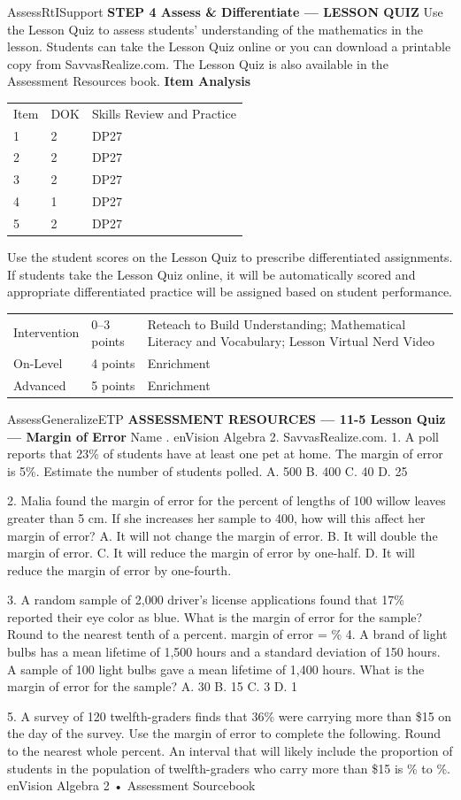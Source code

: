 \documentclass{article}
\newenvironment{te-addendum}[2]{}{}     %
\newcommand{\answer}[1]{}               %
\begin{document}
\begin{te-addendum}{Assess}{RtISupport}
\textbf{STEP 4 Assess & Differentiate — LESSON QUIZ}
Use the Lesson Quiz to assess students' understanding of the mathematics in the lesson.
Students can take the Lesson Quiz online or you can download a printable copy from SavvasRealize.com. The Lesson Quiz is also available in the Assessment Resources book.
\textbf{Item Analysis}
\begin{tabular}{lll}
Item & DOK & Skills Review and Practice \\
1 & 2 & DP27 \\
2 & 2 & DP27 \\
3 & 2 & DP27 \\
4 & 1 & DP27 \\
5 & 2 & DP27 \\
\end{tabular}
Use the student scores on the Lesson Quiz to prescribe differentiated assignments.
If students take the Lesson Quiz online, it will be automatically scored and appropriate differentiated practice will be assigned based on student performance.
\begin{tabular}{lll}
Intervention & 0–3 points & Reteach to Build Understanding; Mathematical Literacy and Vocabulary; Lesson Virtual Nerd Video \\
On-Level & 4 points & Enrichment \\
Advanced & 5 points & Enrichment \\
\end{tabular}
\end{te-addendum}
\begin{te-addendum}{Assess}{GeneralizeETP}
\textbf{ASSESSMENT RESOURCES — 11-5 Lesson Quiz — Margin of Error}
Name \underline{\hspace{2cm}}. enVision Algebra 2. SavvasRealize.com.
1. A poll reports that 23\% of students have at least one pet at home. The margin of error is 5\%. Estimate the number of students polled.
A. 500
B. 400
C. 40
D. 25
\answer{B}
2. Malia found the margin of error for the percent of lengths of 100 willow leaves greater than 5 cm. If she increases her sample to 400, how will this affect her margin of error?
A. It will not change the margin of error.
B. It will double the margin of error.
C. It will reduce the margin of error by one-half.
D. It will reduce the margin of error by one-fourth.
\answer{C}
3. A random sample of 2,000 driver's license applications found that 17\% reported their eye color as blue. What is the margin of error for the sample? Round to the nearest tenth of a percent.
margin of error = \answer{2.2}\%
4. A brand of light bulbs has a mean lifetime of 1,500 hours and a standard deviation of 150 hours. A sample of 100 light bulbs gave a mean lifetime of 1,400 hours. What is the margin of error for the sample?
A. 30
B. 15
C. 3
D. 1
\answer{A}
5. A survey of 120 twelfth-graders finds that 36\% were carrying more than \$15 on the day of the survey. Use the margin of error to complete the following. Round to the nearest whole percent.
An interval that will likely include the proportion of students in the population of twelfth-graders who carry more than \$15 is \answer{27}\% to \answer{45}\%.
enVision Algebra 2 • Assessment Sourcebook
\end{te-addendum}
\end{document}
